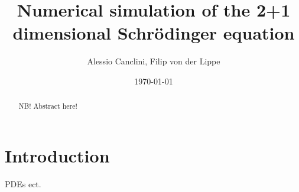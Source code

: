 \documentclass[english,notitlepage,reprint,nofootinbib]{revtex4-1}  %
\begin{document}
\title{Numerical simulation of the 2+1 dimensional Schrödinger equation}  %
\author{Alessio Canclini, Filip von der Lippe} %
\date{\today}                             %
\noaffiliation                            %

\begin{abstract}
   NB! Abstract here!
\end{abstract}
\maketitle


\section{Introduction}
%
PDEs ect.

\end{document}
